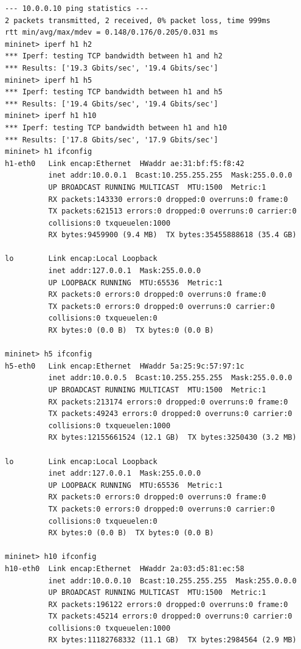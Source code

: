 \documentclass[a4paper, 11pt]{article}
\begin{document}
\begin{appendices}
\begin{lstlisting}[style=BashInputStyle]
--- 10.0.0.10 ping statistics ---
2 packets transmitted, 2 received, 0% packet loss, time 999ms
rtt min/avg/max/mdev = 0.148/0.176/0.205/0.031 ms
mininet> iperf h1 h2
*** Iperf: testing TCP bandwidth between h1 and h2
*** Results: ['19.3 Gbits/sec', '19.4 Gbits/sec']
mininet> iperf h1 h5
*** Iperf: testing TCP bandwidth between h1 and h5
*** Results: ['19.4 Gbits/sec', '19.4 Gbits/sec']
mininet> iperf h1 h10
*** Iperf: testing TCP bandwidth between h1 and h10
*** Results: ['17.8 Gbits/sec', '17.9 Gbits/sec']
mininet> h1 ifconfig
h1-eth0   Link encap:Ethernet  HWaddr ae:31:bf:f5:f8:42
          inet addr:10.0.0.1  Bcast:10.255.255.255  Mask:255.0.0.0
          UP BROADCAST RUNNING MULTICAST  MTU:1500  Metric:1
          RX packets:143330 errors:0 dropped:0 overruns:0 frame:0
          TX packets:621513 errors:0 dropped:0 overruns:0 carrier:0
          collisions:0 txqueuelen:1000
          RX bytes:9459900 (9.4 MB)  TX bytes:35455888618 (35.4 GB)

lo        Link encap:Local Loopback
          inet addr:127.0.0.1  Mask:255.0.0.0
          UP LOOPBACK RUNNING  MTU:65536  Metric:1
          RX packets:0 errors:0 dropped:0 overruns:0 frame:0
          TX packets:0 errors:0 dropped:0 overruns:0 carrier:0
          collisions:0 txqueuelen:0
          RX bytes:0 (0.0 B)  TX bytes:0 (0.0 B)

mininet> h5 ifconfig
h5-eth0   Link encap:Ethernet  HWaddr 5a:25:9c:57:97:1c
          inet addr:10.0.0.5  Bcast:10.255.255.255  Mask:255.0.0.0
          UP BROADCAST RUNNING MULTICAST  MTU:1500  Metric:1
          RX packets:213174 errors:0 dropped:0 overruns:0 frame:0
          TX packets:49243 errors:0 dropped:0 overruns:0 carrier:0
          collisions:0 txqueuelen:1000
          RX bytes:12155661524 (12.1 GB)  TX bytes:3250430 (3.2 MB)

lo        Link encap:Local Loopback
          inet addr:127.0.0.1  Mask:255.0.0.0
          UP LOOPBACK RUNNING  MTU:65536  Metric:1
          RX packets:0 errors:0 dropped:0 overruns:0 frame:0
          TX packets:0 errors:0 dropped:0 overruns:0 carrier:0
          collisions:0 txqueuelen:0
          RX bytes:0 (0.0 B)  TX bytes:0 (0.0 B)

mininet> h10 ifconfig
h10-eth0  Link encap:Ethernet  HWaddr 2a:03:d5:81:ec:58
          inet addr:10.0.0.10  Bcast:10.255.255.255  Mask:255.0.0.0
          UP BROADCAST RUNNING MULTICAST  MTU:1500  Metric:1
          RX packets:196122 errors:0 dropped:0 overruns:0 frame:0
          TX packets:45214 errors:0 dropped:0 overruns:0 carrier:0
          collisions:0 txqueuelen:1000
          RX bytes:11182768332 (11.1 GB)  TX bytes:2984564 (2.9 MB)


\end{lstlisting}
\end{appendices}
\end{document}

